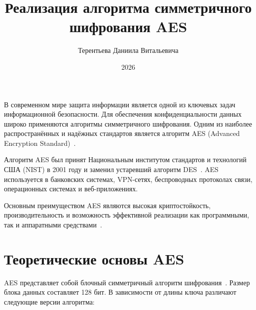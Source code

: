 \documentclass[coursework]{SCWorks}
\begin{document}

\title{Реализация алгоритма симметричного шифрования AES}




\author{Терентьева Даниила Витальевича}





\date{2026}

\maketitle

\secNumbering

\tableofcontents

\intro

В современном мире защита информации является одной из ключевых задач
информационной безопасности. Для обеспечения конфиденциальности данных широко
применяются алгоритмы симметричного шифрования. Одним из наиболее
распространённых и надёжных стандартов является алгоритм
AES (Advanced Encryption Standard)~\cite{fips197}.

Алгоритм AES был принят Национальным институтом стандартов и технологий
США (NIST) в 2001 году и заменил устаревший алгоритм DES~\cite{fips197}.
AES используется в банковских системах, VPN-сетях, беспроводных протоколах
связи, операционных системах и веб-приложениях.

Основным преимуществом AES являются высокая криптостойкость, производительность
и возможность эффективной реализации как программными, так и аппаратными
средствами~\cite{daemen2002}.

\section{Теоретические основы AES}

AES представляет собой блочный симметричный алгоритм шифрования~\cite{fips197}.
Размер блока данных составляет 128 бит. В зависимости от длины ключа различают
следующие версии алгоритма:
\end{document}
